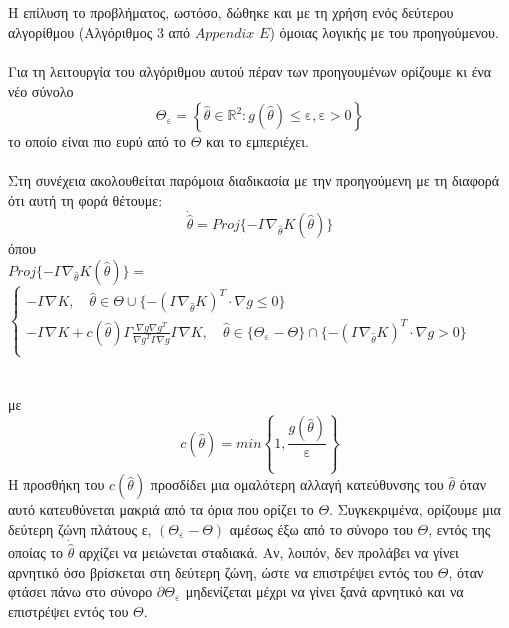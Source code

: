 \documentclass[12pt]{article}
\begin{document}
\\ \\
Η επίλυση το προβλήματος, ωστόσο, δώθηκε και με τη χρήση ενός δεύτερου αλγορίθμου (Αλγόριθμος 3 από $Appendix$ $E$) όμοιας λογικής με του προηγούμενου.
\\ \\
Για τη λειτουργία του αλγόριθμου αυτού πέραν των προηγουμένων ορίζουμε κι ένα νέο σύνολο 
\[ \Theta_{\text{ε}}= \left \{ \hat{\theta} \in \mathbb{R}^2 : g(\hat{\theta}) \leq \text{ε} ,\text{ε}>0 \right \} \]
το οποίο είναι πιο ευρύ από το $\Theta$ και το εμπεριέχει.
\\ \\
Στη συνέχεια ακολουθείται παρόμοια διαδικασία με την προηγούμενη με τη διαφορά ότι αυτή τη φορά θέτουμε:
\[ \dot{\hat{\theta}}=Proj \{ -\Gamma \nabla_{\hat{\theta}} K(\hat{\theta}) \} \]
όπου
\\
$Proj \{ -\Gamma \nabla_{\hat{\theta}} K(\hat{\theta}) \}=$
$ \left\{
    \begin{array}{l}
        -\Gamma \nabla K , \quad \hat{\theta} \in \Theta \cup \{  -(\Gamma \nabla_{\hat{\theta}} K)^{T} \cdot \nabla g \leq 0 \}  \\
        -\Gamma \nabla K + c(\hat{\theta}) \Gamma \frac{\nabla g \nabla    g^{T}}{\nabla g^{T} \Gamma \nabla g}\Gamma \nabla K, \quad \hat{\theta} \in \{ \Theta_{\text{ε}}-\Theta \} \cap \{  -(\Gamma \nabla_{\hat{\theta}} K)^{T} \cdot \nabla g > 0 \} \\   
    \end{array}
    \right.$
\\ \\ \\
με 
\[c(\hat{\theta})=min \left \{ 1, \frac{g(\hat{\theta})}{\text{ε}} \right \}\]
Η προσθήκη του $c(\hat{\theta})$ προσδίδει μια ομαλότερη αλλαγή κατεύθυνσης του $\hat{\theta}$ όταν αυτό κατευθύνεται μακριά από τα όρια που ορίζει το $\Theta$. Συγκεκριμένα, ορίζουμε μια δεύτερη ζώνη πλάτους ε, $(\Theta_{\text{ε}}-\Theta )$ αμέσως έξω από το σύνορο του $\Theta$, εντός της οποίας το $\dot{\hat{\theta}}$ αρχίζει να μειώνεται σταδιακά. Αν, λοιπόν, δεν προλάβει να γίνει αρνητικό όσο βρίσκεται στη δεύτερη ζώνη, ώστε να επιστρέψει εντός του $\Theta$, όταν φτάσει πάνω στο σύνορο $\partial \Theta_{\text{ε}}$ μηδενίζεται μέχρι να γίνει ξανά αρνητικό και να επιστρέψει εντός του $\Theta$.  
\end{document}
